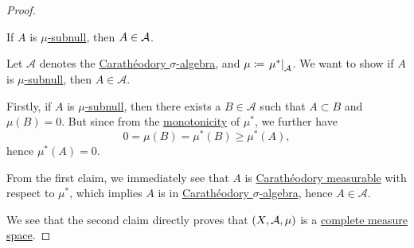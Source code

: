 \begin{proof}
	\begin{claim}
		If \(A\) is \hyperref[def:mu-subnull-set]{\(\mu\)-subnull}, then \(A\in \mathcal{\MakeUppercase{a}} \).
	\end{claim}
	\begin{explanation}
		Let \(\mathcal{A} \) denotes the \hyperref[thm:Caratheodory-extension-Thm]{Carathéodory \(\sigma\)-algebra}, and \(\mu\coloneqq \left.\mu^{\ast} \right\vert_{\mathcal{A} }^{} \). We want to show if
		\(A\) is \hyperref[def:mu-subnull-set]{\(\mu\)-subnull}, then \(A\in\mathcal{A} \).

		\par Firstly, if \(A\) is \hyperref[def:mu-subnull-set]{\(\mu \)-subnull}, then there exists a \(B\in \mathcal{A} \) such that \(A\subset B\) and \(\mu (B) = 0\). But since from
		the \hyperref[def:outer-measure-montonicity]{monotonicity} of \(\mu ^{\ast} \), we further have
		\[
			0 = \mu(B) = \mu ^{\ast} (B) \geq \mu ^{\ast} (A),
		\]
		hence \(\mu ^{\ast} (A) = 0\).

		\par  From the first claim, we immediately see that \(A\) is \hyperref[def:C-measurable]{Carathéodory measurable} with respect to \(\mu ^{\ast}\),
		which implies \(A\) is in \hyperref[thm:Caratheodory-extension-Thm]{Carathéodory \(\sigma\)-algebra}, hence \(A\in \mathcal{A} \).
	\end{explanation}

	We see that the second claim directly proves that \((X, \mathcal{\MakeUppercase{a}} , \mu )\) is a \hyperref[def:complete-measure-space]{complete measure space}.
\end{proof}

